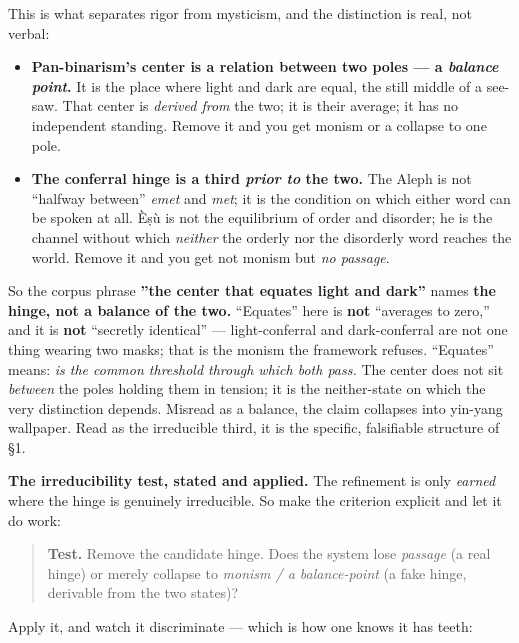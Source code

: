 \documentclass[11pt]{article}
\begin{document}
This is what separates rigor from mysticism, and the distinction is real, not verbal:

\begin{itemize}
\item \textbf{Pan-binarism's center is a relation between two poles — a \emph{balance point}.} It is the place where light and dark are equal, the still middle of a see-saw. That center is \emph{derived from} the two; it is their average; it has no independent standing. Remove it and you get monism or a collapse to one pole.
\item \textbf{The conferral hinge is a third \emph{prior to} the two.} The Aleph is not ``halfway between'' \emph{emet} and \emph{met}; it is the condition on which either word can be spoken at all. Èṣù is not the equilibrium of order and disorder; he is the channel without which \emph{neither} the orderly nor the disorderly word reaches the world. Remove it and you get not monism but \emph{no passage}.
\end{itemize}

So the corpus phrase \textbf{''the center that equates light and dark''} names \textbf{the hinge, not a balance of the two.} ``Equates'' here is \textbf{not} ``averages to zero,'' and it is \textbf{not} ``secretly identical'' — light-conferral and dark-conferral are not one thing wearing two masks; that is the monism the framework refuses. ``Equates'' means: \emph{is the common threshold through which both pass.} The center does not sit \emph{between} the poles holding them in tension; it is the neither-state on which the very distinction depends. Misread as a balance, the claim collapses into yin-yang wallpaper. Read as the irreducible third, it is the specific, falsifiable structure of §1.

\textbf{The irreducibility test, stated and applied.} The refinement is only \emph{earned} where the hinge is genuinely irreducible. So make the criterion explicit and let it do work:

\begin{quote}
\textbf{Test.} Remove the candidate hinge. Does the system lose \emph{passage} (a real hinge) or merely collapse to \emph{monism /\allowbreak{} a balance-point} (a fake hinge, derivable from the two states)?
\end{quote}

Apply it, and watch it discriminate — which is how one knows it has teeth:
\end{document}
